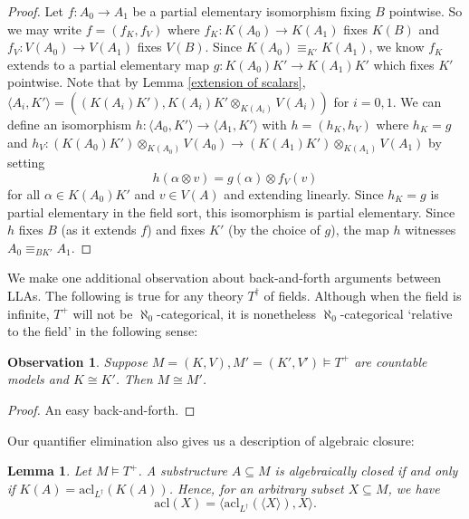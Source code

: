 \documentclass[psamsfonts]{amsart}
\newtheorem{obs}[thm]{Observation}
\newtheorem{lem}[thm]{Lemma}
\theoremstyle{definition}
\theoremstyle{definition}
\theoremstyle{remark}
\numberwithin{equation}{section}
\renewcommand{\models}{\vDash}
\begin{document}
\begin{proof}
    Let $f : A_{0} \to A_{1}$ be a partial elementary isomorphism fixing $B$ pointwise. So we may write $f = (f_{K},f_{V})$ where $f_{K} : K(A_{0}) \to K(A_{1})$ fixes $K(B)$ and $f_{V}: V(A_0) \to V(A_1)$ fixes $V(B)$. Since $K(A_{0}) \equiv_{K'} K(A_{1})$, we know $f_{K}$ extends to a partial elementary map $g: K(A_{0})K' \to K(A_{1})K'$ which fixes $K'$ pointwise. Note that by Lemma \ref{extension of scalars}, $\langle A_{i},K'\rangle = ((K(A_{i})K'),K(A_{i})K' \otimes_{K(A_{i})} V(A_{i}))$ for $i = 0,1$. We can define an isomorphism $h : \langle A_{0},K' \rangle \to \langle A_{1},K' \rangle$ with $h = (h_{K},h_{V})$ where $h_{K} = g$ and $h_{V} : (K(A_{0})K') \otimes_{K(A_{0})} V(A_{0}) \to (K(A_{1})K') \otimes_{K(A_{1})} V(A_{1})$ by setting 
    $$
    h(\alpha \otimes v) = g(\alpha) \otimes f_{V}(v)
    $$
    for all $\alpha \in K(A_{0})K'$ and $v \in V(A)$ and extending linearly. Since $h_{K} = g$ is partial elementary in the field sort, this isomorphism is partial elementary.  Since $h$ fixes $B$ (as it extends $f$) and fixes $K'$ (by the choice of $g$), the map $h$ witnesses $A_{0} \equiv_{BK'} A_{1}$. 
\end{proof}

We make one additional observation about back-and-forth arguments between LLAs. The following is true for any theory $T^{\dagger}$ of fields.  Although when the field is infinite, $T^{+}$ will not be $\aleph_{0}$-categorical, it is nonetheless $\aleph_{0}$-categorical `relative to the field' in the following sense:

\begin{obs}
Suppose $M = (K,V), M' = (K',V') \models T^{+}$ are countable models and $K \cong K'$.  Then $M \cong M'$. 
\end{obs}

\begin{proof}
An easy back-and-forth. 
\end{proof}



Our quantifier elimination also gives us a description of algebraic closure:

\begin{lem} \label{lm:algclos}
    Let $M \models T^{+}$. A substructure $A \subseteq M$ is algebraically closed if and only if $K(A) = \mathrm{acl}_{L^{\dagger}}(K(A))$.  Hence, for an arbitrary subset $X \subseteq M$, we have
    $$
    \mathrm{acl}(X) = \langle \mathrm{acl}_{L^{\dagger}}(\langle X \rangle),X \rangle. 
    $$
\end{lem}
\end{document}
